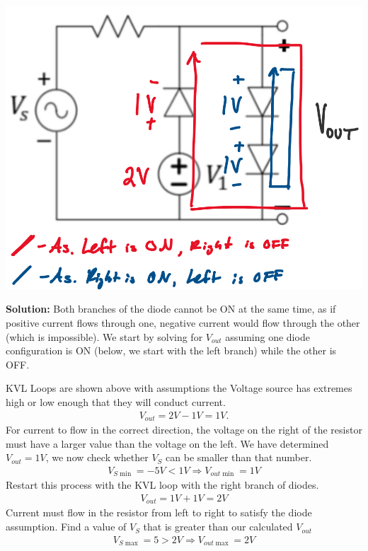 \documentclass{article}
\begin{document}
\begin{center}

        \includegraphics[width=0.75\linewidth]{figures/21_sol.png}
\end{center}

\textbf{Solution:} 
Both branches of the diode cannot be ON at the same time, as if positive current flows through one, negative current would flow through the other (which is impossible). We start by solving for $V_{out}$ assuming one diode configuration is ON (below, we start with the left branch) while the other is OFF.

KVL Loops are shown above with assumptions the Voltage source has extremes high or low enough that they will conduct current.
\begin{align*}
    V_{out} = 2V-1V = 1V.
\end{align*}
\indent For current to flow in the correct direction, the voltage on the right of the resistor must have a larger value than the voltage on the left. We have determined $V_{out} = 1V$, we now check whether $V_S$ can be smaller than that number.
\begin{align*}
    V_{S\min} = -5V < 1V \Rightarrow \boxed{V_{out\min} = 1V}
\end{align*}
\indent Restart this process with the KVL loop with the right branch of diodes. 
\begin{align*}
    V_{out} = 1V+1V = 2V
\end{align*}
\indent Current must flow in the resistor from left to right to satisfy the diode assumption. Find a value of $V_S$ that is greater than our calculated $V_{out}$
\begin{align*}
    V_{S\max} = 5 > 2V \Rightarrow \boxed{V_{out\max} = 2V}
\end{align*}
\end{document}
